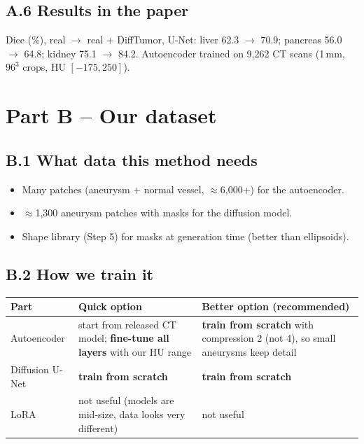 \documentclass[11pt,a4paper,oneside]{report}
\begin{document}
\subsection*{A.6 Results in the paper}
Dice (\%), real $\rightarrow$ real + DiffTumor, U-Net: liver 62.3 $\rightarrow$ 70.9; pancreas 56.0 $\rightarrow$ 64.8; kidney 75.1 $\rightarrow$ 84.2. Autoencoder trained on 9{,}262 CT scans (1\,mm, $96^3$ crops, HU $[-175,250]$).

\section{Part B -- Our dataset}

\subsection*{B.1 What data this method needs}
\begin{itemize}
  \item Many patches (aneurysm + normal vessel, $\approx$6{,}000+) for the autoencoder.
  \item $\approx$1{,}300 aneurysm patches with masks for the diffusion model.
  \item Shape library (Step 5) for masks at generation time (better than ellipsoids).
\end{itemize}

\subsection*{B.2 How we train it}
\begin{center}
\small
\begin{tabularx}{\linewidth}{lXX}
\toprule
\textbf{Part} & \textbf{Quick option} & \textbf{Better option (recommended)} \\
\midrule
Autoencoder & start from released CT model; \textbf{fine-tune all layers} with our HU range & \textbf{train from scratch} with compression 2 (not 4), so small aneurysms keep detail \\
Diffusion U-Net & \textbf{train from scratch} & \textbf{train from scratch} \\
LoRA & not useful (models are mid-size, data looks very different) & not useful \\
\bottomrule
\end{tabularx}
\end{center}
\end{document}
